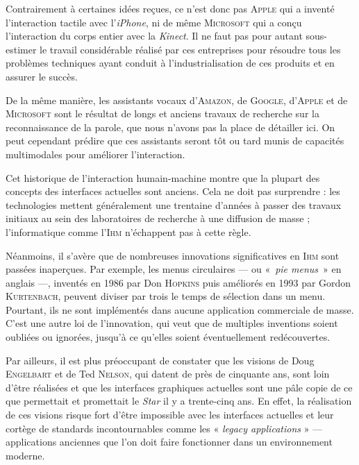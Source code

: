 Contrairement à certaines idées reçues, ce n’est donc pas \textsc{Apple} qui a inventé l’interaction tactile avec l’\textit{iPhone}, ni de même \textsc{Microsoft} qui a conçu l’interaction du corps entier avec la \textit{Kinect}. Il ne faut pas pour autant sous-estimer le travail considérable réalisé par ces entreprises pour résoudre tous les problèmes techniques ayant conduit à l'industrialisation de ces produits et en assurer le succès. 

De la même manière, les assistants vocaux d’\textsc{Amazon}, de \textsc{Google}, d'\textsc{Apple} et de \textsc{Microsoft} sont le résultat de longs et anciens travaux de recherche sur la reconnaissance de la parole, que nous n’avons pas la place de détailler ici. On peut cependant prédire que ces assistants seront tôt ou tard munis de capacités multimodales pour améliorer l’interaction.



Cet historique de l'interaction humain-machine montre que la plupart des concepts des interfaces actuelles sont anciens. Cela ne doit pas surprendre : les technologies mettent généralement une trentaine d'années à passer des travaux initiaux au sein des laboratoires de recherche à une diffusion de masse ; l'informatique comme l'\textsc{Ihm} n’échap\-pent pas à cette règle.

Néanmoins, il s'avère que de nombreuses innovations significatives en \textsc{Ihm} sont passées inaperçues. Par exemple, les menus circulaires --- ou «~\textit{pie menus}~» en anglais ---, inventés en 1986 par Don \textsc{Hopkins} puis améliorés en 1993 par Gordon \textsc{Kurtenbach}, peuvent diviser par trois le temps de sélection dans un menu. Pourtant, ils ne sont implémentés dans aucune application commerciale de masse. C’est une autre loi de l’innovation, qui veut que de multiples inventions soient oubliées ou ignorées, jusqu’à ce qu’elles soient éventuellement redécouvertes.

Par ailleurs, il est plus préoccupant de constater que les visions de Doug \textsc{Engelbart} et de Ted \textsc{Nelson}, qui datent de près de cinquante ans, sont loin d'être réalisées et que les interfaces graphiques actuelles sont une pâle copie de ce que permettait et promettait le \textit{Star} il y a trente-cinq ans. En effet, la réalisation de ces visions risque fort d'être impossible avec les interfaces actuelles et leur cortège de standards incontournables comme les « \textit{legacy applications} » --- applications anciennes que l'on doit faire fonctionner dans un environnement moderne.

